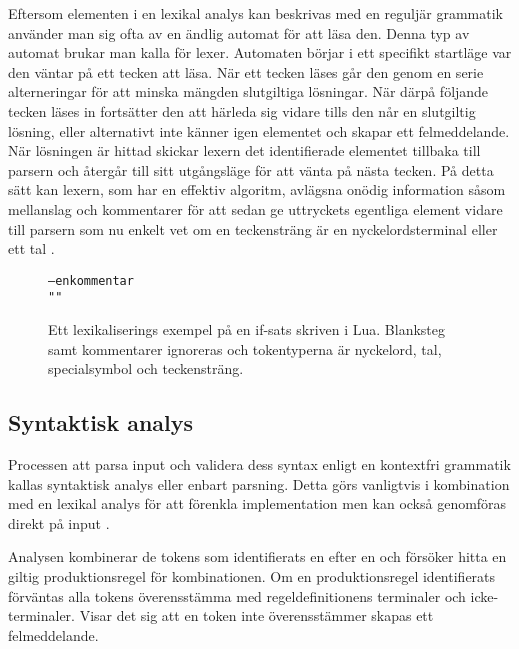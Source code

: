 Eftersom elementen i en lexikal analys kan beskrivas med en reguljär grammatik
använder man sig ofta av en ändlig automat för att läsa den. Denna typ av
automat brukar man kalla för lexer. Automaten börjar i ett specifikt startläge
var den väntar på ett tecken att läsa. När ett tecken läses går den genom en
serie alterneringar för att minska mängden slutgiltiga lösningar. När därpå
följande tecken läses in fortsätter den att härleda sig vidare tills den når
en slutgiltig lösning, eller alternativt inte känner igen elementet och skapar
ett felmeddelande. När lösningen är hittad skickar lexern det identifierade
elementet tillbaka till parsern och återgår till sitt utgångsläge för att
vänta på nästa tecken.  På detta sätt kan lexern, som har en effektiv
algoritm, avlägsna onödig information såsom mellanslag och kommentarer för att
sedan ge uttryckets egentliga element vidare till parsern som nu enkelt vet om
en teckensträng är en nyckelordsterminal eller ett tal \citep[s.  51]{sm09}.

\begin{figure}[ht]
  \begin{alltt}
  \boxpunct{+}  \boxpunct{>}  \boxpunct{==}  
  -- en kommentar
   ""\boxpunct{;}
  \end{alltt}
  \caption{Ett lexikaliserings exempel på en if-sats skriven i Lua.
    Blanksteg samt kommentarer ignoreras och tokentyperna är nyckelord, tal,
    specialsymbol och teckensträng.} \label{fig:yacc}
\end{figure}

\subsection{Syntaktisk analys}

Processen att parsa input och validera dess syntax enligt en kontextfri
grammatik kallas syntaktisk analys eller enbart parsning. Detta görs
vanligtvis i kombination med en lexikal analys för att förenkla
implementation men kan också genomföras direkt på input \citep[s. 8]{aa06}.

Analysen kombinerar de tokens som identifierats en efter en och försöker hitta
en giltig produktionsregel för kombinationen. Om en produktionsregel
identifierats förväntas alla tokens överensstämma med regeldefinitionens
terminaler och icke-terminaler. Visar det sig att en token inte överensstämmer
skapas ett felmeddelande.

